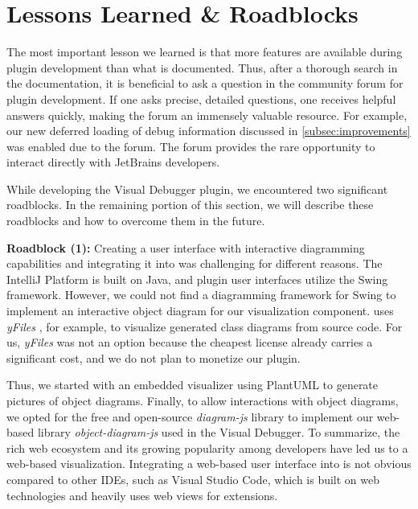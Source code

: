 \documentclass[sigconf]{acmart}
\begin{document}
\section{Lessons Learned \& Roadblocks} \label{sec:lessonsLearned}
The most important lesson we learned is that more features are available during plugin development than what is documented.
Thus, after a thorough search in the documentation, it is beneficial to ask a question in the community forum for plugin development.
If one asks precise, detailed questions, one receives helpful answers quickly, making the forum an immensely valuable resource.
For example, our new deferred loading of debug information discussed in \autoref{subsec:improvements} was enabled due to the \intellij{} forum.
The forum provides the rare opportunity to interact directly with JetBrains developers.

While developing the Visual Debugger plugin, we encountered two significant roadblocks.
In the remaining portion of this section, we will describe these roadblocks and how to overcome them in the future.

\textbf{Roadblock (1):} Creating a user interface with interactive diagramming capabilities and integrating it into \intellij{} was challenging for different reasons.
The IntelliJ Platform is built on Java, and plugin user interfaces utilize the Swing framework.
However, we could not find a diagramming framework for Swing to implement an interactive object diagram for our visualization component.
\intellij{} uses \textit{yFiles} \cite{yworksYFilesDiagrammingLibrary2023}, for example, to visualize generated class diagrams from source code.
For us, \textit{yFiles} was not an option because the cheapest license already carries a significant cost, and we do not plan to monetize our plugin.

Thus, we started with an embedded visualizer using PlantUML \cite{arnaudroquesPlantUML2023} to generate pictures of object diagrams.
Finally, to allow interactions with object diagrams, we opted for the free and open-source \textit{diagram-js} library to implement our web-based library \textit{object-diagram-js} \cite{timkrauterObjectdiagramjs2023} used in the Visual Debugger.
To summarize, the rich web ecosystem and its growing popularity among developers have led us to a web-based visualization.
Integrating a web-based user interface into \intellij{} is not obvious compared to other IDEs, such as Visual Studio Code, which is built on web technologies and heavily uses web views for extensions.
\end{document}
